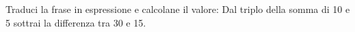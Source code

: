 \item Traduci la frase in espressione e calcolane il valore: Dal triplo della somma di 10 e 5 sottrai la differenza tra 30 e 15.